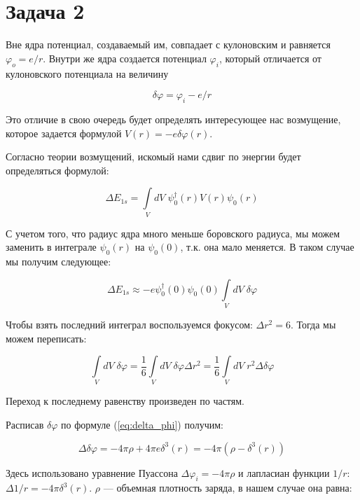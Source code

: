 \documentclass[a4paper, 12pt]{article}
\renewcommand{\phi}{\varphi} %
\begin{document}
\section*{Задача 2}

Вне ядра потенциал, создаваемый им, совпадает с кулоновским и равняется $\phi_o = e / r$. Внутри же ядра создается потенциал $\phi_i$, который отличается от кулоновского потенциала на величину

\begin{equation}
	\delta \phi = \phi_i - e / r
	\label{eq:delta_phi}
\end{equation}

Это отличие в свою очередь будет определять интересующее нас возмущение, которое задается формулой $V(r) = - e \delta \phi (r)$.

Согласно теории возмущений, искомый нами сдвиг по энергии будет определяться формулой:

\begin{equation*}
	\Delta E_{1s} = \int\limits_V dV \; \psi_0^\dagger(r) V(r) \psi_0(r)
\end{equation*}

С учетом того, что радиус ядра много меньше боровского радиуса, мы можем заменить в интеграле $\psi_0(r)$ на $\psi_0(0)$, т.к. она мало меняется. В таком случае мы получим следующее:

\begin{equation}
	\Delta E_{1s} \approx - e \psi_0^{\dagger}(0)\psi_0(0) \int \limits_V dV \; \delta \phi 
	\label{eq:delta_E}
\end{equation}

Чтобы взять последний интеграл воспользуемся фокусом: $\Delta r^2 = 6$. Тогда мы можем переписать:

\begin{equation*}
	\int\limits_V dV\; \delta \phi = \frac{1}{6} \int\limits_V dV \; \delta\phi \Delta r^2 = \frac{1}{6} \int\limits_V dV \; r^2 \Delta \delta\phi 
\end{equation*}

Переход к последнему равенству произведен по частям.

Расписав $\delta\phi$ по формуле (\ref{eq:delta_phi}) получим:

\begin{equation*}
	\Delta\delta \phi = -4\pi\rho + 4\pi e \delta^3(r) = -4\pi (\rho - \delta^3(r))
\end{equation*}

Здесь использовано уравнение Пуассона $\Delta \phi_i = -4\pi\rho$ и лапласиан функции $1/r$: \mbox{$\Delta 1/r = -4\pi\delta^3(r)$}. $\rho$ --- объемная плотность заряда, в нашем случае она равна:
\end{document}
